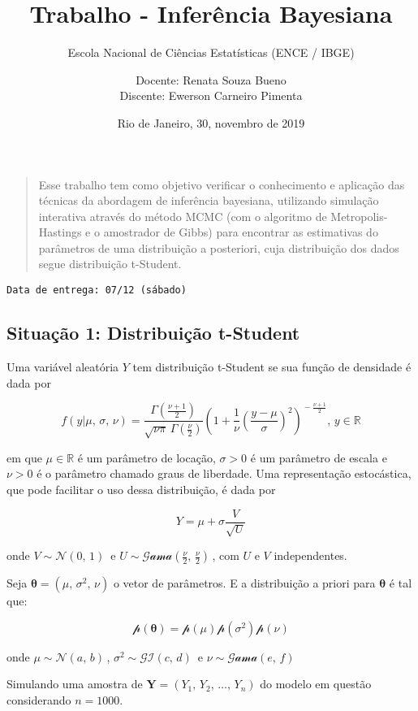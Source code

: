 \documentclass[]{article}
\title{Trabalho - Inferência Bayesiana}
\subtitle{Escola Nacional de Ciências Estatísticas (ENCE / IBGE)}
\author{Docente: Renata Souza Bueno \\ Discente: Ewerson Carneiro Pimenta}
\date{Rio de Janeiro, 30, novembro de 2019}
\begin{document}
\maketitle

\begin{quote}
Esse trabalho tem como objetivo verificar o conhecimento e aplicação das
técnicas da abordagem de inferência bayesiana, utilizando simulação
interativa através do método MCMC (com o algoritmo de
Metropolis-Hastings e o amostrador de Gibbs) para encontrar as
estimativas do parâmetros de uma distribuição a posteriori, cuja
distribuição dos dados segue distribuição t-Student.
\end{quote}

\texttt{Data\ de\ entrega:\ 07/12\ (sábado)}

\hypertarget{situauxe7uxe3o-1-distribuiuxe7uxe3o-t-student}{%
\subsection{Situação 1: Distribuição
t-Student}\label{situauxe7uxe3o-1-distribuiuxe7uxe3o-t-student}}

Uma variável aleatória \(Y\) tem distribuição t-Student se sua função de
densidade é dada por

\[
f(y|\mu,\,\sigma,\,\nu) = \frac{\Gamma(\frac{\nu+1}{2})} {\sqrt{\nu\pi}\,\Gamma(\frac{\nu}{2})} \left(1+\frac{1}{\nu}\left(\frac{y-\mu}{\sigma}\right)^{2} \right)^{\!-\frac{\nu+1}{2}},\,y\in \mathbb{R}\!
\]

em que \(\mu\in\mathbb{R}\) é um parâmetro de locação, \(\sigma > 0\) é
um parâmetro de escala e \(\nu >0\) é o parâmetro chamado graus de
liberdade. Uma representação estocástica, que pode facilitar o uso dessa
distribuição, é dada por

\[
Y = \mu + \sigma\frac{V}{\sqrt{U}}
\]

onde \(V \sim \mathcal{N}(0,\,1)\,\) e
\(U \sim \mathcal{Gama}(\frac{\nu}{2},\,\frac{\nu}{2})\,\), com \(U\) e
\(V\) independentes.

Seja \(\pmb{\theta} = (\mu,\,\sigma^{2},\,\nu)\) o vetor de parâmetros.
E a distribuição a priori para \(\pmb{\theta}\) é tal que:

\[\mathcal{p}(\pmb{\theta}) = \mathcal{p}(\mu)\mathcal{p}(\sigma^{2})\mathcal{p}(\nu)\]

onde \(\mu \sim \mathcal{N}(a,\,b)\,\),
\(\sigma^{2} \sim \mathcal{GI}(c,\,d)\,\) e
\(\nu \sim \mathcal{Gama}(e,\,f)\,\)

Simulando uma amostra de \(\pmb{Y} = (Y_1,\,Y_2,\,\ldots,\,Y_n)\) do
modelo em questão considerando \(n=1000\).
\end{document}

